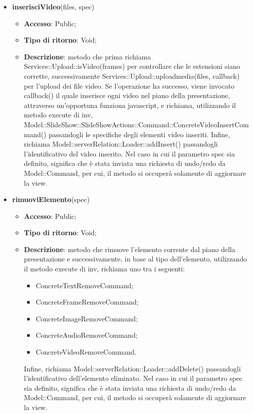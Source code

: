 {{\begin{itemize}
		\item \textbf{inserisciVideo}(files, spec)
		\begin{itemize}
			\item \textbf{Accesso}: Public;
			\item \textbf{Tipo di ritorno}: Void;
			\item \textbf{Descrizione}: metodo che prima richiama Services::\-Upload::\-isVideo(frames) per controllare che le estensioni siano corrette, successivamente Services::\-Upload::\-uploadmedia(files, callback) per l'upload dei file video. Se l'operazione ha successo, viene invocato callback() il quale inserisce ogni video nel piano della presentazione, attraverso un'opportuna funziona javascript, e richiama, utilizzando il metodo execute di inv, Model::\-SlideShow::\-SlideShowActions::\-Command::\-ConcreteVideoInsertCommand() passandogli le specifiche degli elementi video inseriti. Infine, richiama Model::\-serverRelation::\-Loader::\-addInsert() passandogli l'identificativo del video inserito. Nel caso in cui il parametro spec sia definito, significa che è stata inviata una richiesta di undo/redo da Model::\-Command, per cui, il metodo si occuperà solamente di aggiornare la view.
		\end{itemize}
		\item \textbf{rimuoviElemento}(spec)
		\begin{itemize}
			\item \textbf{Accesso}: Public;
			\item \textbf{Tipo di ritorno}: Void;
			\item \textbf{Descrizione}: metodo che rimuove l'elemento corrente dal piano della presentazione e successivamente, in base al tipo dell'elemento, utilizzando il metodo execute di inv, richiama uno tra i seguenti:
			\begin{itemize}
				\item ConcreteTextRemoveCommand;
				\item ConcreteFrameRemoveCommand;
				\item ConcreteImageRemoveCommand;
				\item ConcreteAudioRemoveCommand;
				\item ConcreteVideoRemoveCommand.
			\end{itemize}
			 Infine, richiama Model::\-serverRelation::\-Loader::\-addDelete() passandogli l'identificativo dell'elemento eliminato. Nel caso in cui il parametro spec sia definito, significa che è stata inviata una richiesta di undo/redo da Model::\-Command, per cui, il metodo si occuperà solamente di aggiornare la view.

\end{itemize}
\end{itemize}}}
